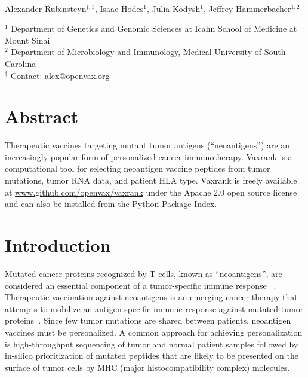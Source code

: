 \documentclass[10pt,letterpaper]{article}
\begin{document}
\vspace*{0.35in}

\begin{flushleft}
{\Large
\textbf{}
}
\newline
\\
Alexander Rubinsteyn$^{\dagger,1}$,
Isaac Hodes$^1$,
Julia Kodysh$^1$,
Jeffrey Hammerbacher$^{1,2}$
\\
\bigskip

    $^1$ Department of Genetics and Genomic Sciences at Icahn School of Medicine at Mount Sinai \\
    $^2$ Department of Microbiology and Immunology, Medical University of South Carolina \\
    $^\dagger$ Contact: \href{alex@openvax.org}{alex@openvax.org} \\


\end{flushleft}

\section*{Abstract}
    Therapeutic vaccines targeting mutant tumor antigens (``neoantigens'') are an increasingly popular form of personalized cancer immunotherapy. Vaxrank is a computational tool for selecting neoantigen vaccine peptides from tumor mutations, tumor RNA data, and patient HLA type.  Vaxrank is freely available at \href{https://www.github.com/openvax/vaxrank}{www.github.com/openvax/vaxrank} under the Apache  2.0 open source license and can also be installed from the Python Package Index.



\section{Introduction}


Mutated cancer proteins recognized by T-cells, known as ``neoantigens'', are considered an essential component of a tumor-specific immune response ~\citep{neoantigens-finnigan, neoantigens-schumacher, neoantigens-gubin}. Therapeutic vaccination against neoantigens is an emerging cancer therapy that attempts to mobilize an antigen-specific immune response against mutated tumor proteins~\citep{neovax-sharma, neovax-sahin}. Since few tumor mutations are shared between patients, neoantigen vaccines must be personalized. A common approach for achieving personalization is high-throughput sequencing of tumor and normal patient samples followed by in-silico prioritization of mutated peptides that are likely to be presented on the surface of tumor cells by MHC (major histocompatibility complex) molecules.
\end{document}
